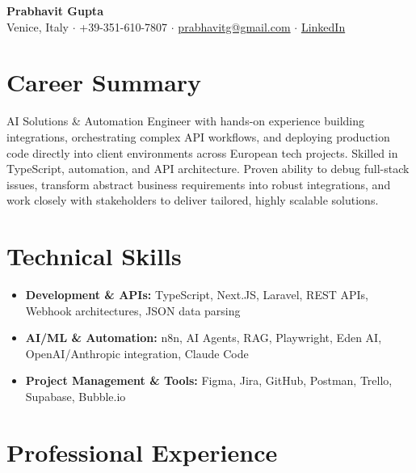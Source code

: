 \documentclass[10pt, a4paper]{article}
\begin{document}
\begin{center}
    {\LARGE \textbf{Prabhavit Gupta}} \\
    \vspace{2mm}
    Venice, Italy $\cdot$ +39-351-610-7807 $\cdot$ \href{mailto:prabhavitg@gmail.com}{prabhavitg@gmail.com} $\cdot$ \href{https://www.linkedin.com/in/prabhavit/}{LinkedIn}
\end{center}

\vspace{2mm}
\section*{Career Summary}
AI Solutions \& Automation Engineer with hands-on experience building integrations, orchestrating complex API workflows, and deploying production code directly into client environments across European tech projects. Skilled in TypeScript, automation, and API architecture. Proven ability to debug full-stack issues, transform abstract business requirements into robust integrations, and work closely with stakeholders to deliver tailored, highly scalable solutions.

\section*{Technical Skills}
\begin{itemize}[leftmargin=0.15in, label={--}]
    \item \textbf{Development \& APIs:} TypeScript, Next.JS, Laravel, REST APIs, Webhook architectures, JSON data parsing
    \item \textbf{AI/ML \& Automation:} n8n, AI Agents, RAG, Playwright, Eden AI, OpenAI/Anthropic integration, Claude Code
    \item \textbf{Project Management \& Tools:} Figma, Jira, GitHub, Postman, Trello, Supabase, Bubble.io
\end{itemize}

\section*{Professional Experience}
\end{document}
